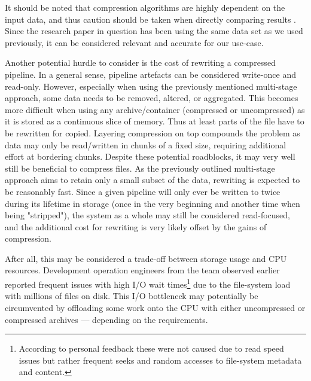             It should be noted that compression algorithms are highly dependent on the input data, and thus caution should be taken when directly comparing results \cite{compression-input-dependence}. Since the research paper in question has been using the same data set as we used previously, it can be considered relevant and accurate for our use-case.
            
            Another potential hurdle to consider is the cost of rewriting a compressed pipeline. In a general sense, pipeline artefacts can be considered write-once and read-only. However, especially when using the previously mentioned multi-stage approach, some data needs to be removed, altered, or aggregated. This becomes more difficult when using any archive/container (compressed or uncompressed) as it is stored as a continuous slice of memory. Thus at least parts of the file have to be rewritten for copied. Layering compression on top compounds the problem as data may only be read/written in chunks of a fixed size, requiring additional effort at bordering chunks. Despite these potential roadblocks, it may very well still be beneficial to compress files. As the previously outlined multi-stage approach aims to retain only a small subset of the data, rewriting is expected to be reasonably fast. Since a given pipeline will only ever be written to twice during its lifetime in storage (once in the very beginning and another time when being "stripped"), the system as a whole may still be considered read-focused, and the additional cost for rewriting is very likely offset by the gains of compression.
            
            After all, this may be considered a trade-off between storage usage and CPU resources. Development operation engineers from the team observed earlier reported frequent issues with high I/O wait times\footnote{According to personal feedback these were not caused due to read speed issues but rather frequent seeks and random accesses to file-system metadata and content.} due to the file-system load with millions of files on disk. This I/O bottleneck may potentially be circumvented by offloading some work onto the CPU with either uncompressed or compressed archives — depending on the requirements.

